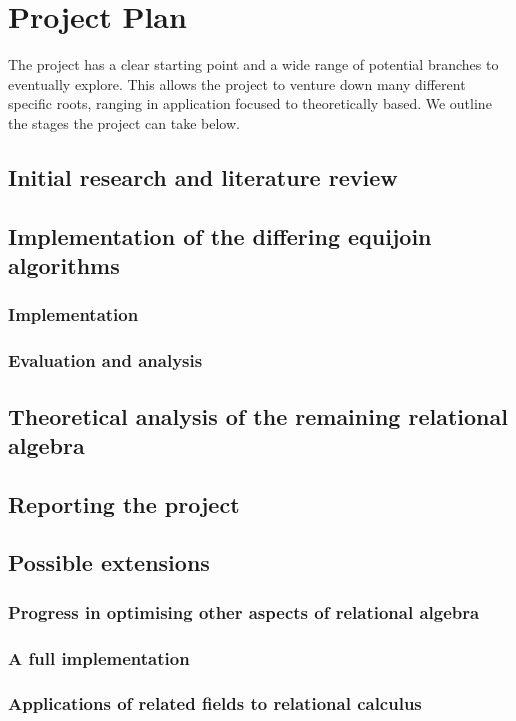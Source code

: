 \chapter{Project Plan} %
\begin{comment}
You should explain what needs to be done in order to complete the project and roughly what you expect the timetable to be. Don’t forget to include the project write-up (the final report), as this is a major part of the exercise. It’s important to identify key milestones and also fall-back positions, in case you run out of time.  You should also identify what extensions could be added if time permits.  The plan should be complete and should include those parts that you have already addressed (make it clear how far you have progressed at the time of writing).  This material will *not* appear in the final report.
\end{comment}

The project has a clear starting point and a wide range of potential branches to eventually explore. This allows the project to venture down many different specific roots, ranging in application focused to theoretically based.
We outline the stages the project can take below.
\section{Initial research and literature review}
\section{Implementation of the differing equijoin algorithms}
\subsection{Implementation}
\subsection{Evaluation and analysis}
\section{Theoretical analysis of the remaining relational algebra}
\section{Reporting the project}
\section{Possible extensions}
\subsection{Progress in optimising other aspects of relational algebra}
\subsection{A full implementation}
\subsection{Applications of related fields to relational calculus}
